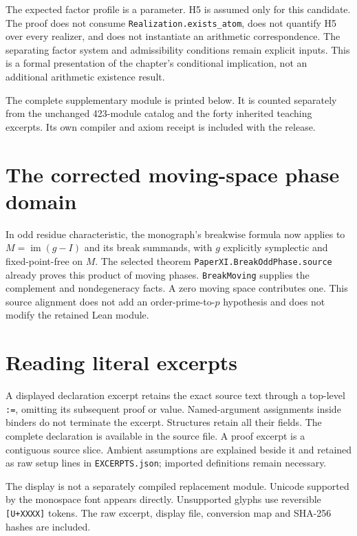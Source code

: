 \documentclass[10pt,oneside]{book}
\begin{document}
The expected factor profile is a parameter. H5 is assumed only for this candidate. The proof does not consume \texttt{Realization.exists\_atom}, does not quantify H5 over every realizer, and does not instantiate an arithmetic correspondence. The separating factor system and admissibility conditions remain explicit inputs. This is a formal presentation of the chapter's conditional implication, not an additional arithmetic existence result.

The complete supplementary module is printed below. It is counted separately from the unchanged 423-module catalog and the forty inherited teaching excerpts. Its own compiler and axiom receipt is included with the release.

\section{The corrected moving-space phase domain}
In odd residue characteristic, the monograph's breakwise formula now applies to \(M=\operatorname{im}(g-I)\) and its break summands, with \(g\) explicitly symplectic and fixed-point-free on \(M\). The selected theorem \nolinkurl{PaperXI.BreakOddPhase.source} already proves this product of moving phases. \nolinkurl{BreakMoving} supplies the complement and nondegeneracy facts. A zero moving space contributes one. This source alignment does not add an order-prime-to-\(p\) hypothesis and does not modify the retained Lean module.

\section{Reading literal excerpts}
A displayed declaration excerpt retains the exact source text through a top-level \texttt{:=}, omitting its subsequent proof or value. Named-argument assignments inside binders do not terminate the excerpt. Structures retain all their fields. The complete declaration is available in the source file. A proof excerpt is a contiguous source slice. Ambient assumptions are explained beside it and retained as raw setup lines in \texttt{EXCERPTS.json}; imported definitions remain necessary.

The display is not a separately compiled replacement module. Unicode supported by the monospace font appears directly. Unsupported glyphs use reversible \texttt{[U+XXXX]} tokens. The raw excerpt, display file, conversion map and SHA-256 hashes are included.
\end{document}

